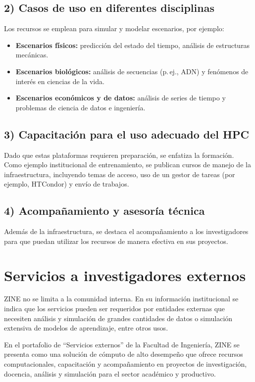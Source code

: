 \subsection*{2) Casos de uso en diferentes disciplinas}
Los recursos se emplean para simular y modelar escenarios, por ejemplo:
\begin{itemize}
  \item \textbf{Escenarios físicos:} predicción del estado del tiempo, análisis de estructuras mecánicas.
  \item \textbf{Escenarios biológicos:} análisis de secuencias (p.\,ej., ADN) y fenómenos de interés en ciencias de la vida.
  \item \textbf{Escenarios económicos y de datos:} análisis de series de tiempo y problemas de ciencia de datos e ingeniería.
\end{itemize}
\cite{perfiles_capacidades_zine}

\subsection*{3) Capacitación para el uso adecuado del HPC}
Dado que estas plataformas requieren preparación, se enfatiza la formación. Como ejemplo institucional de entrenamiento, se publican cursos de manejo de la infraestructura, incluyendo temas de acceso, uso de un gestor de tareas (por ejemplo, HTCondor) y envío de trabajos. \cite{curso_hpc_python}

\subsection*{4) Acompañamiento y asesoría técnica}
Además de la infraestructura, se destaca el acompañamiento a los investigadores para que puedan utilizar los recursos de manera efectiva en sus proyectos. \cite{perfiles_capacidades_zine,pesquisa_zine_2012}

\section{Servicios a investigadores externos}
ZINE no se limita a la comunidad interna. En su información institucional se indica que los servicios pueden ser requeridos por entidades externas que necesiten análisis y simulación de grandes cantidades de datos o simulación extensiva de modelos de aprendizaje, entre otros usos. \cite{zine_oficial}

En el portafolio de “Servicios externos” de la Facultad de Ingeniería, ZINE se presenta como una solución de cómputo de alto desempeño que ofrece recursos computacionales, capacitación y acompañamiento en proyectos de investigación, docencia, análisis y simulación para el sector académico y productivo. \cite{servicios_externos_zine}

